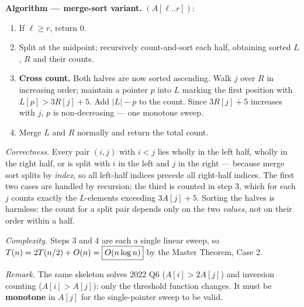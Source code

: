 \textbf{Algorithm --- merge-sort variant.} $(A[\ell..r])$:
\begin{enumerate}
  \item If $\ell\ge r$, return $0$.
  \item Split at the midpoint; recursively count-and-sort each half, obtaining sorted $L$, $R$
        and their counts.
  \item \textbf{Cross count.} Both halves are now sorted ascending. Walk $j$ over $R$ in
        increasing order; maintain a pointer $p$ into $L$ marking the first position with
        $L[p]>3R[j]+5$. Add $|L|-p$ to the count. Since $3R[j]+5$ increases with $j$, $p$ is
        non-decreasing --- one monotone sweep.
  \item Merge $L$ and $R$ normally and return the total count.
\end{enumerate}
\emph{Correctness.} Every pair $(i,j)$ with $i<j$ lies wholly in the left half, wholly in the
right half, or is split with $i$ in the left and $j$ in the right --- because merge sort splits by
\emph{index}, so all left-half indices precede all right-half indices. The first two cases are
handled by recursion; the third is counted in step 3, which for each $j$ counts exactly the
$L$-elements exceeding $3A[j]+5$. Sorting the halves is harmless: the count for a split pair
depends only on the two \emph{values}, not on their order within a half.

\emph{Complexity.} Steps 3 and 4 are each a single linear sweep, so
$T(n)=2T(n/2)+O(n)=\boxed{O(n\log n)}$ by the Master Theorem, Case 2.

\emph{Remark.} The same skeleton solves 2022 Q6 ($A[i]>2A[j]$) and inversion counting
($A[i]>A[j]$): only the threshold function changes. It must be \textbf{monotone} in $A[j]$ for the
single-pointer sweep to be valid.

